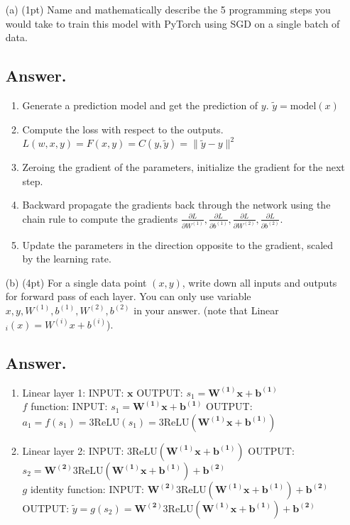 \documentclass{article}
\begin{document}
\begin{itemize}
    \item[(a)] (1pt) Name and mathematically describe the 5 programming steps you would take to train this model with PyTorch using SGD on a single batch of data.
    \subsection*{Answer.}
    \begin{enumerate}
    \item Generate a prediction model and get the prediction of $y$.  $\tilde{y} = \text{model}(x)$
    \item Compute the loss with respect to the outputs. $L(w, x, y) = F(x, y) = C(y, \tilde{y}) = \|\tilde{y} - y\|^2$
    \item  Zeroing the gradient of the parameters, initialize the gradient for the next step. 
    \item Backward propagate the gradients back through the network using the chain rule to compute the gradients \(\frac{\partial L}{\partial W^{(1)}}, \frac{\partial L}{\partial b^{(1)}}, \frac{\partial L}{\partial W^{(2)}}, \frac{\partial L}{\partial b^{(2)}}\).
    \item Update the parameters in the direction opposite to the gradient, scaled by the learning rate.
    \end{enumerate}
    
    \item[(b)] (4pt) For a single data point $(x, y)$, write down all inputs and outputs for forward pass of each layer. You can only use variable $x, y, W^{(1)}, b^{(1)}, W^{(2)}, b^{(2)}$ in your answer. (note that Linear$_i(x) = W^{(i)}x + b^{(i)}$).
    \subsection*{Answer.}
    \begin{enumerate}
        \item Linear layer 1: INPUT: $\boldsymbol{x}$ OUTPUT: $s_1 = \boldsymbol{{W}^{(1)}}\boldsymbol{x} + \boldsymbol{{b}^{(1)}}$ \\
        $f$ function: INPUT: $s_1 = \boldsymbol{{W}^{(1)}}\boldsymbol{x} + \boldsymbol{{b}^{(1)}}$ OUTPUT: $a_1 = f(s_1) = 3\text{ReLU}(s_1) = 3\text{ReLU}(\boldsymbol{{W}^{(1)}}\boldsymbol{x} + \boldsymbol{{b}^{(1)}})$
        \item Linear layer 2: INPUT: $3\text{ReLU}(\boldsymbol{{W}^{(1)}} \boldsymbol{x} + \boldsymbol{{b}^{(1)}})$ OUTPUT: $s_2 = \boldsymbol{{W}^{(2)}}3\text{ReLU}(\boldsymbol{{W}^{(1)}}\boldsymbol{x} + \boldsymbol{{b}^{(1)}}) + \boldsymbol{{b}^{(2)}}$\\
        $g$ identity function: INPUT: $\boldsymbol{{W}^{(2)}}3\text{ReLU}(\boldsymbol{{W}^{(1)}}\boldsymbol{x} + \boldsymbol{{b}^{(1)}}) + \boldsymbol{{b}^{(2)}}$ OUTPUT: $\tilde{y} = g(s_2) = \boldsymbol{{W}^{(2)}}3\text{ReLU}(\boldsymbol{{W}^{(1)}}\boldsymbol{x} + \boldsymbol{{b}^{(1)}}) + \boldsymbol{{b}^{(2)}}$
    \end{enumerate}
    

\end{itemize}
\end{document}
